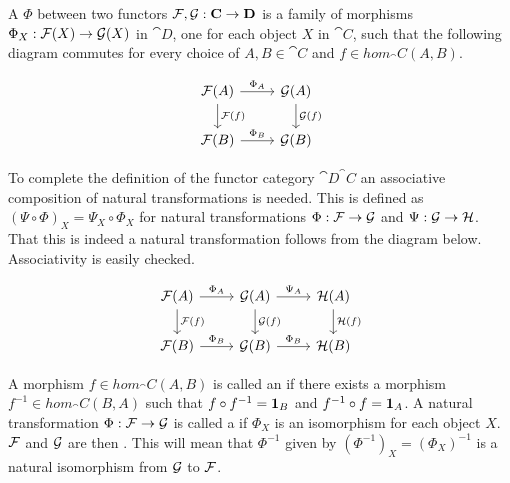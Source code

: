 \documentclass[../../main.tex]{subfiles}
\begin{document}
    \begin{definition}
        A  $\Phi$ between two functors $\functor{F}, \functor{G}: \cat{C} \to \cat{D}$ is a family of morphisms $\Phi_X: \functor{F}(X) \to \functor{G}(X)$ in $\cat{D}$, one for each object $X$ in $\cat{C}$, such that the following diagram commutes for every choice of $A, B \in \cat{C}$ and $f \in hom_\cat{C}(A, B)$. 
    \end{definition}

    \begin{figure}[H]
        \[
            \begin{tikzcd}
                \functor{F}(A) \arrow[r, "\Phi_A"] \arrow[d, "\functor{F}(f)"]
                & \functor{G}(A) \arrow[d, "\functor{G}(f)"]\\
                \functor{F}(B) \arrow[r, "\Phi_B"]
                & \functor{G}(B)
            \end{tikzcd}
        \]
    \end{figure}

    To complete the definition of the functor category $\cat{D}^\cat{C}$ an associative composition of natural transformations is needed. This is defined as $(\Psi \circ \Phi)_X = \Psi_X \circ \Phi_X$ for natural transformations $\Phi: \functor{F} \to \functor{G}$ and $\Psi: \functor{G} \to \functor{H}$. That this is indeed a natural transformation follows from the diagram below. Associativity is easily checked.

    \begin{figure}[H]
        \[
            \begin{tikzcd}
                \functor{F}(A) \arrow[r, "\Phi_A"] \arrow[d, "\functor{F}(f)"]
                & \functor{G}(A) \arrow[r, "\Psi_A"] \arrow[d, "\functor{G}(f)"]
                & \functor{H}(A) \arrow[d, "\functor{H}(f)"]\\
                \functor{F}(B) \arrow[r, "\Phi_B"]
                & \functor{G}(B) \arrow[r, "\Phi_B"]
                & \functor{H}(B)
            \end{tikzcd}
        \]
    \end{figure}

    A morphism $f \in hom_\cat{C}(A, B)$ is called an  if there exists a morphism $f^{-1} \in hom_\cat{C}(B,A)$ such that $f \circ f^{-1} = \idarrow[B]$ and $f^{-1} \circ f = \idarrow[A]$. A natural transformation $\Phi: \functor{F} \to \functor{G}$ is called a  if $\Phi_X$ is an isomorphism for each object $X$. $\functor{F}$ and $\functor{G}$ are then . This will mean that $\Phi^{-1}$ given by $(\Phi^{-1})_X = (\Phi_X)^{-1}$ is a natural isomorphism from $\functor{G}$ to $\functor{F}$.
    
\end{document}
